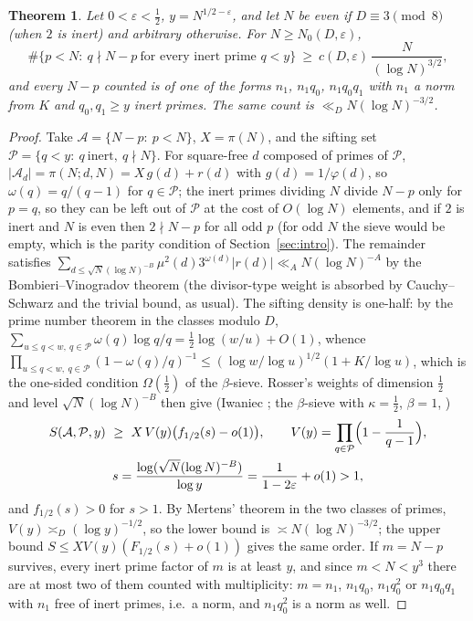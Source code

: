 \documentclass[11pt]{amsart}
\newtheorem{theorem}{Theorem}[section]
\theoremstyle{definition}
\theoremstyle{remark}
\newcommand{\e}{\varepsilon}
\begin{document}
\begin{theorem}\label{thm:halfdim}
Let $0<\e<\frac12$, $y=N^{1/2-\e}$, and let $N$ be even if $D\equiv3\pmod8$ (when $2$ is inert) and arbitrary otherwise. For $N\ge N_0(D,\e)$,
\[
\#\{p<N:\ q\nmid N-p\ \text{for every inert prime }q<y\}\ \ge\ c(D,\e)\,\frac N{(\log N)^{3/2}},
\]
and every $N-p$ counted is of one of the forms $n_1$, $n_1q_0$, $n_1q_0q_1$ with $n_1$ a norm from $K$ and $q_0,q_1\ge y$ inert primes. The same count is $\ll_D N(\log N)^{-3/2}$.
\end{theorem}
\begin{proof}
Take $\mathcal A=\{N-p:\ p<N\}$, $X=\pi(N)$, and the sifting set $\mathcal P=\{q<y:\ q\ \text{inert},\ q\nmid N\}$. For square-free $d$ composed of primes of $\mathcal P$, $|\mathcal A_d|=\pi(N;d,N)=X\,g(d)+r(d)$ with $g(d)=1/\varphi(d)$, so $\omega(q)=q/(q-1)$ for $q\in\mathcal P$; the inert primes dividing $N$ divide $N-p$ only for $p=q$, so they can be left out of $\mathcal P$ at the cost of $O(\log N)$ elements, and if $2$ is inert and $N$ is even then $2\nmid N-p$ for all odd $p$ (for odd $N$ the sieve would be empty, which is the parity condition of Section~\ref{sec:intro}). The remainder satisfies $\sum_{d\le\sqrt N(\log N)^{-B}}\mu^2(d)3^{\omega(d)}|r(d)|\ll_A N(\log N)^{-A}$ by the Bombieri--Vinogradov theorem (the divisor-type weight is absorbed by Cauchy--Schwarz and the trivial bound, as usual). The sifting density is one-half: by the prime number theorem in the classes modulo $D$, $\sum_{u\le q<w,\ q\in\mathcal P}\omega(q)\log q/q=\frac12\log(w/u)+O(1)$, whence $\prod_{u\le q<w,\ q\in\mathcal P}(1-\omega(q)/q)^{-1}\le(\log w/\log u)^{1/2}(1+K/\log u)$, which is the one-sided condition $\Omega(\frac12)$ of the $\beta$-sieve. Rosser's weights of dimension $\frac12$ and level $\sqrt N(\log N)^{-B}$ then give (Iwaniec \cite{Iwaniec76}; the $\beta$-sieve with $\kappa=\frac12$, $\beta=1$, \cite[Chapters~11 and 14]{FI10})
\begin{gather*}
S(\mathcal A,\mathcal P,y)\ \ge\ X\,V(y)\bigl(f_{1/2}(s)-o(1)\bigr),\qquad V(y)=\prod_{q\in\mathcal P}\Bigl(1-\frac1{q-1}\Bigr),\\
s=\frac{\log(\sqrt N(\log N)^{-B})}{\log y}=\frac1{1-2\e}+o(1)>1,
\end{gather*}
and $f_{1/2}(s)>0$ for $s>1$. By Mertens' theorem in the two classes of primes, $V(y)\asymp_D(\log y)^{-1/2}$, so the lower bound is $\asymp N(\log N)^{-3/2}$; the upper bound $S\le XV(y)(F_{1/2}(s)+o(1))$ gives the same order. If $m=N-p$ survives, every inert prime factor of $m$ is at least $y$, and since $m<N<y^3$ there are at most two of them counted with multiplicity: $m=n_1$, $n_1q_0$, $n_1q_0^2$ or $n_1q_0q_1$ with $n_1$ free of inert primes, i.e.\ a norm, and $n_1q_0^2$ is a norm as well.
\end{proof}
\end{document}
